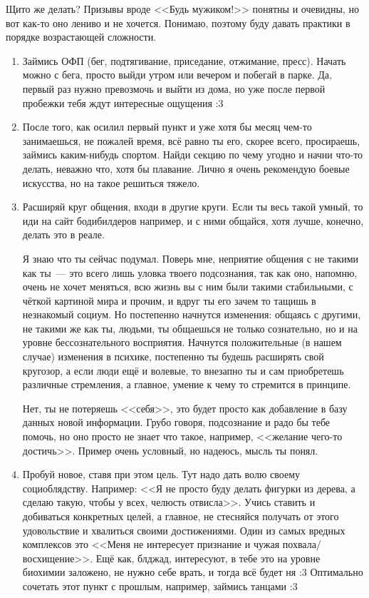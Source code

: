 \documentclass[a4paper,14pt,oneside]{memoir}
\begin{document}
Щито же делать? Призывы вроде <<Будь мужиком!>> понятны и очевидны, но вот как-то оно лениво и не хочется. Понимаю, поэтому буду давать практики в порядке возрастающей сложности.

\begin{enumerate}
\item Займись ОФП (бег, подтягивание, приседание, отжимание, пресс). Начать можно с бега, просто выйди утром или вечером и побегай в парке. Да, первый раз нужно превозмочь и выйти из дома, но уже после первой пробежки тебя ждут интересные ощущения :3
\item После того, как осилил первый пункт и уже хотя бы месяц чем-то занимаешься, не пожалей время, всё равно ты его, скорее всего, просираешь, займись каким-нибудь спортом. Найди секцию по чему угодно и начни что-то делать, неважно что, хотя бы плавание. Лично я очень рекомендую боевые искусства, но на такое решиться тяжело.
\item Расширяй круг общения, входи в другие круги. Если ты весь такой умный, то иди на сайт бодибилдеров например, и с ними общайся, хотя лучше, конечно, делать это в реале.

Я знаю что ты сейчас подумал. Поверь мне, неприятие общения с не такими как ты~--- это всего лишь уловка твоего подсознания, так как оно, напомню, очень не хочет меняться, всю жизнь вы с ним были такими стабильными, с чёткой картиной мира и прочим, и вдруг ты его зачем то тащишь в незнакомый социум. Но постепенно начнутся изменения: общаясь с другими, не такими же как ты, людьми, ты общаешься не только сознательно, но и на уровне бессознательного восприятия. Начнутся положительные (в нашем случае) изменения в психике, постепенно ты будешь расширять свой кругозор, а если люди ещё и волевые, то внезапно ты и сам приобретешь различные стремления, а главное, умение к чему то стремится в принципе.

Нет, ты не потеряешь <<себя>>, это будет просто как добавление в базу данных новой информации. Грубо говоря, подсознание и радо бы тебе помочь, но оно просто не знает что такое, например, <<желание чего-то достичь>>. Пример очень условный, но надеюсь, мысль ты понял.
\item Пробуй новое, ставя при этом цель. Тут надо дать волю своему социоблядству. Например: <<Я не просто буду делать фигурки из дерева, а сделаю такую, чтобы у всех, челюсть отвисла>>. Учись ставить и добиваться конкретных целей, а главное, не стесняйся получать от этого удовольствие и хвалиться своими достижениями. Один из самых вредных комплексов это <<Меня не интересует признание и чужая похвала/восхищение>>. Ещё как, блджад, интересуют, в тебе это на уровне биохимии заложено, не нужно себе врать, и тогда всё будет ня :3 Оптимально сочетать этот пункт с прошлым, например, займись танцами :3


\end{enumerate}
\end{document}
